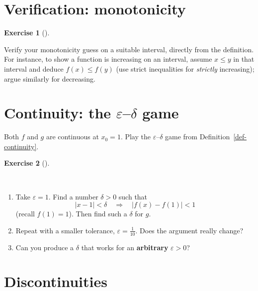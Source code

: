 \documentclass[
  letterpaper,
  DIV=11,
  numbers=noendperiod]{scrreprt}
\providecommand{\tightlist}{%
  \setlength{\itemsep}{0pt}\setlength{\parskip}{0pt}}
\theoremstyle{plain}
\theoremstyle{plain}
\theoremstyle{definition}
\theoremstyle{definition}
\newtheorem{exercise}{Exercise}[chapter]
\theoremstyle{definition}
\theoremstyle{plain}
\theoremstyle{plain}
\theoremstyle{remark}
\begin{document}
\section{Verification: monotonicity}\label{verification-monotonicity}

\begin{exercise}[]\protect\hypertarget{exr-activity-monotone}{}\label{exr-activity-monotone}

Verify your monotonicity guess on a suitable interval, directly from the
definition. For instance, to show a function is increasing on an
interval, assume \(x \le y\) in that interval and deduce
\(f(x) \le f(y)\) (use strict inequalities for \emph{strictly}
increasing); argue similarly for decreasing.

\end{exercise}

\section{\texorpdfstring{Continuity: the \(\varepsilon\)--\(\delta\)
game}{Continuity: the \textbackslash varepsilon--\textbackslash delta game}}\label{continuity-the-varepsilondelta-game}

Both \(f\) and \(g\) are continuous at \(x_0 = 1\). Play the
\(\varepsilon\)--\(\delta\) game from Definition~\ref{def-continuity}.

\begin{exercise}[]\protect\hypertarget{exr-activity-eps-delta}{}\label{exr-activity-eps-delta}

~

\begin{enumerate}
\def\labelenumi{\arabic{enumi}.}
\tightlist
\item
  Take \(\varepsilon = 1\). Find a number \(\delta > 0\) such that \[
  \lvert x - 1 \rvert < \delta \quad \Rightarrow \quad\lvert f(x) - f(1) \rvert < 1
  \] (recall \(f(1) = 1\)). Then find such a \(\delta\) for \(g\).
\item
  Repeat with a smaller tolerance, \(\varepsilon = \tfrac{1}{10}\). Does
  the argument really change?
\item
  Can you produce a \(\delta\) that works for an \textbf{arbitrary}
  \(\varepsilon > 0\)?
\end{enumerate}

\end{exercise}

\section{Discontinuities}\label{discontinuities}
\end{document}
